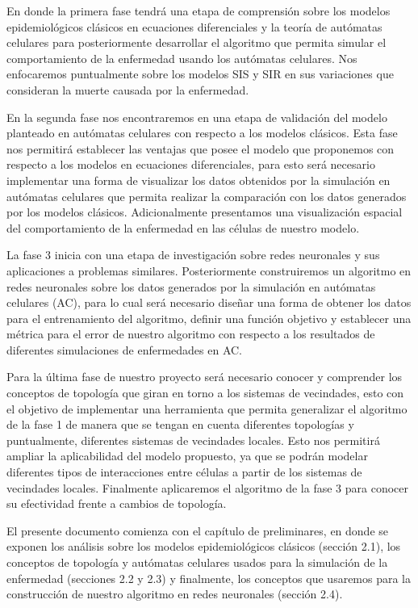 En donde la primera fase tendrá una etapa de comprensión sobre los modelos epidemiológicos clásicos en ecuaciones diferenciales y la teoría de autómatas celulares para posteriormente desarrollar el algoritmo que permita simular el comportamiento de la enfermedad usando los autómatas celulares. Nos enfocaremos puntualmente sobre los modelos SIS y SIR en sus variaciones que consideran la muerte causada por la enfermedad.

En la segunda fase nos encontraremos en una etapa de validación del modelo planteado en autómatas celulares con respecto a los modelos clásicos. Esta fase nos permitirá establecer las ventajas que posee el modelo que proponemos con respecto a los modelos en ecuaciones diferenciales, para esto será necesario implementar una forma de visualizar los datos obtenidos por la simulación en autómatas celulares que permita realizar la comparación con los datos generados por los modelos clásicos. Adicionalmente presentamos una visualización espacial del comportamiento de la enfermedad en las células de nuestro modelo.

La fase 3 inicia con una etapa de investigación sobre redes neuronales y sus aplicaciones a problemas similares. Posteriormente construiremos un algoritmo en redes neuronales sobre los datos generados por la simulación en autómatas celulares (AC), para lo cual será necesario diseñar una forma de obtener los datos para el entrenamiento del algoritmo, definir una función objetivo y establecer una métrica para el error de nuestro algoritmo con respecto a los resultados de diferentes simulaciones de enfermedades en AC.

Para la última fase de nuestro proyecto será necesario conocer y comprender los conceptos de topología que giran en torno a los sistemas de vecindades, esto con el objetivo de implementar una herramienta que permita generalizar el algoritmo de la fase 1 de manera que se tengan en cuenta diferentes topologías y puntualmente, diferentes sistemas de vecindades locales. Esto nos permitirá ampliar la aplicabilidad del modelo propuesto, ya que se podrán modelar diferentes tipos de interacciones entre células a partir de los sistemas de vecindades locales. Finalmente aplicaremos el algoritmo de la fase 3 para conocer su efectividad frente a cambios de topología.

El presente documento comienza con el capítulo de preliminares, en donde se exponen los análisis sobre los modelos epidemiológicos clásicos (sección 2.1), los conceptos de topología y autómatas celulares usados para la simulación de la enfermedad (secciones 2.2 y 2.3) y finalmente, los conceptos que usaremos para la construcción de nuestro algoritmo en redes neuronales (sección 2.4).


